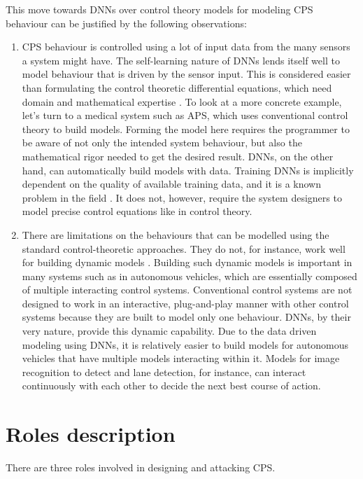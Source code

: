 This move towards DNNs over control theory models for modeling \ac{CPS} behaviour can be justified by the following observations: %
\begin{enumerate}
	\item CPS behaviour is controlled using a lot of input data from the many sensors a system might have. The self-learning nature of DNNs lends itself well to model behaviour that is driven by the sensor input. This is considered easier than formulating the control theoretic differential equations, which need domain and mathematical expertise \cite{Aamir_2013}.
	To look at a more concrete example, let's turn to a medical system such as \ac{APS}, which uses conventional control theory to build models. Forming the model here requires the programmer to be aware of not only the intended system behaviour, but also the mathematical rigor needed to get the desired result. DNNs, on the other hand, can automatically build models with data.
	Training DNNs is implicitly dependent on the quality of available training data, and it is a known problem in the field . It does not, however, require the system designers to model precise control equations like in control theory.
	\item  There are limitations on the behaviours that can be modelled using the standard control-theoretic approaches. They do not, for instance, work well for building dynamic models \cite{article23}. Building such dynamic models is important in many systems such as in autonomous vehicles, which are essentially composed of multiple interacting control systems. Conventional control systems are not designed to work in an interactive, plug-and-play manner with other control systems because they are built to model only one behaviour. DNNs, by their very nature,  provide this dynamic capability. Due to the data driven modeling using DNNs, it is relatively easier to build models for autonomous vehicles that have multiple models interacting within it. Models for image recognition to detect and lane detection, for instance, can interact continuously with each other to decide the next best course of action.
\end{enumerate}


\section{Roles description}
There are three roles involved in designing and attacking \ac{CPS}.

